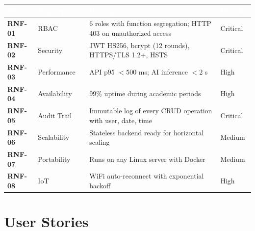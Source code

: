 \documentclass[12pt,a4paper,twoside]{report}
\begin{document}
\begin{center}
\begin{tabularx}{\textwidth}{|>{\bfseries}p{2cm}|p{3cm}|X|p{1.8cm}|}
\hline
\rowcolor{tableHdr}
\textcolor{white}{\textbf{ID}} & \textcolor{white}{\textbf{Requirement}} &
\textcolor{white}{\textbf{Description}} & \textcolor{white}{\textbf{Priority}} \\
\hline
\rowcolor{rowOdd}RNF-01 & RBAC & 6 roles with function segregation; HTTP 403 on unauthorized access & Critical \\
\hline\rowcolor{rowEven}RNF-02 & Security & JWT HS256, bcrypt (12 rounds), HTTPS/TLS 1.2+, HSTS & Critical \\
\hline\rowcolor{rowOdd}RNF-03 & Performance & API p95 $< 500$ ms; AI inference $< 2$ s & High \\
\hline\rowcolor{rowEven}RNF-04 & Availability & 99\% uptime during academic periods & High \\
\hline\rowcolor{rowOdd}RNF-05 & Audit Trail & Immutable log of every CRUD operation with user, date, time & Critical \\
\hline\rowcolor{rowEven}RNF-06 & Scalability & Stateless backend ready for horizontal scaling & Medium \\
\hline\rowcolor{rowOdd}RNF-07 & Portability & Runs on any Linux server with Docker & Medium \\
\hline\rowcolor{rowEven}RNF-08 & IoT & WiFi auto-reconnect with exponential backoff & High \\
\hline
\end{tabularx}
\end{center}

\chapter{User Stories}
\end{document}
